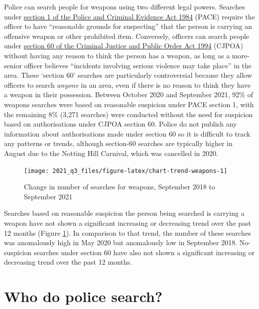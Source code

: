 \documentclass[
  a4paper,
  twoside, 11pt]{article}
\begin{document}
Police can search people for weapons using two different legal powers. Searches under \href{https://www.legislation.gov.uk/ukpga/1984/60/section/1}{section 1 of the Police and Criminal Evidence Act 1984} (PACE) require the officer to have ``reasonable grounds for suspecting'' that the person is carrying an offensive weapon or other prohibited item. Conversely, officers can search people under \href{https://www.legislation.gov.uk/ukpga/1994/33/section/60}{section 60 of the Criminal Justice and Public Order Act 1994} (CJPOA) without having any reason to think the person has a weapon, as long as a more-senior officer believes ``incidents involving serious violence may take place'' in the area. These `section 60' searches are particularly controversial because they allow officers to search \emph{anyone} in an area, even if there is no reason to think they have a weapon in their possession. Between October 2020 and September 2021, 92\% of weapons searches were based on reasonable suspicion under PACE section 1, with the remaining 8\% (3,271 searches) were conducted without the need for suspicion based on authorisations under CJPOA section 60. Police do not publish any information about authorisations made under section 60 so it is difficult to track any patterns or trends, although section-60 searches are typically higher in August due to the Notting Hill Carnival, which was cancelled in 2020.



\begin{figure}[tb]

{\centering \texttt{[image: 2021\_q3\_files/figure-latex/chart-trend-weapons-1]} 

}

\caption{Change in number of searches for weapons, September 2018 to September 2021}\label{fig:chart-trend-weapons}
\end{figure}

Searches based on reasonable suspicion the person being searched is carrying a weapon have not shown a significant increasing or decreasing trend over the past 12 months (Figure \ref{fig:chart-trend-weapons}). In comparison to that trend, the number of these searches was anomalously high in May 2020 but anomalously low in September 2018.
No-suspicion searches under section 60 have also not shown a significant increasing or decreasing trend over the past 12 months.

\hypertarget{who-do-police-search}{%
\section{Who do police search?}\label{who-do-police-search}}
\end{document}
